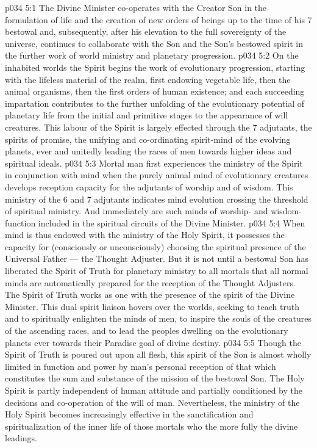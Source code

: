 \vs p034 5:1 The Divine Minister co\hyp{}operates with the Creator Son in the formulation of life and the creation of new orders of beings up to the time of his 7 bestowal and, subsequently, after his elevation to the full sovereignty of the universe, continues to collaborate with the Son and the Son’s bestowed spirit in the further work of world ministry and planetary progression.
\vs p034 5:2 On the inhabited worlds the Spirit begins the work of evolutionary progression, starting with the lifeless material of the realm, first endowing vegetable life, then the animal organisms, then the first orders of human existence; and each succeeding impartation contributes to the further unfolding of the evolutionary potential of planetary life from the initial and primitive stages to the appearance of will creatures. This labour of the Spirit is largely effected through the 7 adjutants, the spirits of promise, the unifying and co\hyp{}ordinating spirit\hyp{}mind of the evolving planets, ever and unitedly leading the races of men towards higher ideas and spiritual ideals.
\vs p034 5:3 \pc Mortal man first experiences the ministry of the Spirit in conjunction with mind when the purely animal mind of evolutionary creatures develops reception capacity for the adjutants of worship and of wisdom. This ministry of the 6 and 7 adjutants indicates mind evolution crossing the threshold of spiritual ministry. And immediately are such minds of worship\hyp{} and wisdom\hyp{}function included in the spiritual circuits of the Divine Minister.
\vs p034 5:4 When mind is thus endowed with the ministry of the Holy Spirit, it possesses the capacity for (consciously or unconsciously) choosing the spiritual presence of the Universal Father --- the Thought Adjuster. But it is not until a bestowal Son has liberated the Spirit of Truth for planetary ministry to all mortals that all normal minds are automatically prepared for the reception of the Thought Adjusters. The Spirit of Truth works as one with the presence of the spirit of the Divine Minister. This dual spirit liaison hovers over the worlds, seeking to teach truth and to spiritually enlighten the minds of men, to inspire the souls of the creatures of the ascending races, and to lead the peoples dwelling on the evolutionary planets ever towards their Paradise goal of divine destiny.
\vs p034 5:5 Though the Spirit of Truth is poured out upon all flesh, this spirit of the Son is almost wholly limited in function and power by man’s personal reception of that which constitutes the sum and substance of the mission of the bestowal Son. The Holy Spirit is partly independent of human attitude and partially conditioned by the decisions and co\hyp{}operation of the will of man. Nevertheless, the ministry of the Holy Spirit becomes increasingly effective in the sanctification and spiritualization of the inner life of those mortals who the more fully  the divine leadings.

